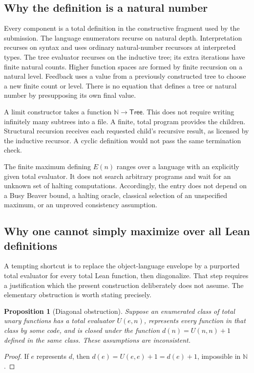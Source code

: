 \documentclass[11pt,letterpaper]{article}
\newtheorem{proposition}[theorem]{Proposition}
\theoremstyle{definition}
\newcommand{\N}{\mathbb N}
\begin{document}
\subsection{Why the definition is a natural number}

Every component is a total definition in the constructive fragment used by the
submission. The language enumerators recurse on natural depth. Interpretation
recurses on syntax and uses ordinary natural-number recursors at interpreted
types. The tree evaluator recurses on the inductive tree; its extra iterations
have finite natural counts. Higher function spaces are formed by finite
recursion on a natural level. Feedback uses a value from a previously
constructed tree to choose a new finite count or level. There is no equation
that defines a tree or natural number by presupposing its own final value.

A limit constructor takes a function \(\N\to\mathsf{Tree}\). This does not
require writing infinitely many subtrees into a file. A finite, total program
provides the children. Structural recursion receives each requested child's
recursive result, as licensed by the inductive recursor. A cyclic definition
would not pass the same termination check.

The finite maximum defining \(E(n)\) ranges over a language with an explicitly
given total evaluator. It does not search arbitrary programs and wait for an
unknown set of halting computations. Accordingly, the entry does not depend
on a Busy Beaver bound, a halting oracle, classical selection of an unspecified
maximum, or an unproved consistency assumption.

\subsection{Why one cannot simply maximize over all Lean definitions}

A tempting shortcut is to replace the object-language envelope by a purported
total evaluator for every total Lean function, then diagonalize. That step
requires a justification which the present construction deliberately does
not assume. The elementary obstruction is worth stating precisely.

\begin{proposition}[Diagonal obstruction]
Suppose an enumerated class of total unary functions has a total evaluator
\(U(e,n)\), represents every function in that class by some code, and is closed
under the function \(d(n)=U(n,n)+1\) defined in the same class. These assumptions
are inconsistent.
\end{proposition}
\begin{proof}
If \(e\) represents \(d\), then
\(d(e)=U(e,e)+1=d(e)+1\), impossible in \(\N\).
\end{proof}
\end{document}
